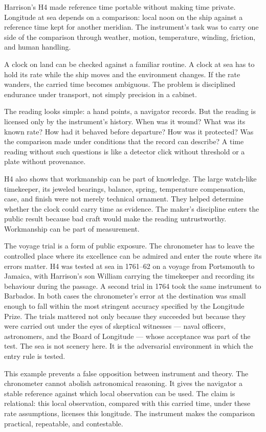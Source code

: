 Harrison's H4 made reference time portable without making time private.
Longitude at sea depends on a comparison: local noon on the ship against
a reference time kept for another meridian. The instrument's task was to
carry one side of the comparison through weather, motion, temperature,
winding, friction, and human handling.

A clock on land can be checked against a familiar routine. A clock at sea
has to hold its rate while the ship moves and the environment changes.
If the rate wanders, the carried time becomes ambiguous. The problem is
disciplined endurance under transport, not simply precision in a cabinet.

The reading looks simple: a hand points, a navigator records. But the
reading is licensed only by the instrument's history. When was it wound?
What was its known rate? How had it behaved before departure? How was it
protected? Was the comparison made under conditions that the record can
describe? A time reading without such questions is like a detector click
without threshold or a plate without provenance.

H4 also shows that workmanship can be part of knowledge. The large
watch-like timekeeper, its jeweled bearings, balance, spring, temperature
compensation, case, and finish were not merely technical ornament. They
helped determine whether the clock could carry time as evidence. The
maker's discipline enters the public result because bad craft would make
the reading untrustworthy. Workmanship can be part of measurement.

The voyage trial is a form of public exposure. The chronometer has to
leave the controlled place where its excellence can be admired and enter
the route where its errors matter. H4 was tested at sea in 1761--62 on a
voyage from Portsmouth to Jamaica, with Harrison's son William carrying
the timekeeper and recording its behaviour during the passage. A second
trial in 1764 took the same instrument to Barbados. In both cases the
chronometer's error at the destination was small enough to fall within
the most stringent accuracy specified by the Longitude Prize. The trials
mattered not only because they succeeded but because they were carried
out under the eyes of skeptical witnesses --- naval officers,
astronomers, and the Board of Longitude --- whose acceptance was part of
the test. The sea is not scenery here. It is the adversarial environment
in which the entry rule is tested.

This example prevents a false opposition between instrument and theory.
The chronometer cannot abolish astronomical reasoning. It gives the
navigator a stable reference against which local observation can be
used. The claim is relational: this local observation, compared with
this carried time, under these rate assumptions, licenses this
longitude. The instrument makes the comparison practical, repeatable,
and contestable.

